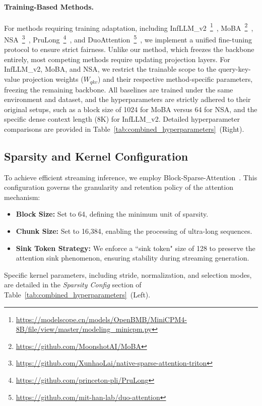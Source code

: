 \paragraph{Training-Based Methods.}
For methods requiring training adaptation, including InfLLM\_v2~\footnote{\url{https://modelscope.cn/models/OpenBMB/MiniCPM4-8B/file/view/master/modeling_minicpm.py}}~\citep{infllmv2}, MoBA~\footnote{\url{https://github.com/MoonshotAI/MoBA}}~\citep{moba}, NSA~\footnote{\url{https://github.com/XunhaoLai/native-sparse-attention-triton}}~\citep{NSA}, PruLong~\footnote{\url{https://github.com/princeton-pli/PruLong}}~\citep{bhaskar2025cache}, and DuoAttention~\footnote{\url{https://github.com/mit-han-lab/duo-attention}}~\citep{xiaoduoattention2025}, we implement a unified fine-tuning protocol to ensure strict fairness.
Unlike our method, which freezes the backbone entirely, most competing methods require updating projection layers. For InfLLM\_v2, MoBA, and NSA, we restrict the trainable scope to the query-key-value projection weights ($W_{qkv}$) and their respective method-specific parameters, freezing the remaining backbone.
All baselines are trained under the same environment and dataset, and the hyperparameters are strictly adhered to their original setups, such as a block size of 1024 for MoBA versus 64 for NSA, and the specific dense context length (8K) for InfLLM\_v2.
Detailed hyperparameter comparisons are provided in Table~\ref{tab:combined_hyperparameters}~(Right).

\subsection{Sparsity and Kernel Configuration}
\label{app:sparsity_config}

To achieve efficient streaming inference, we employ Block-Sparse-Attention~\citep{guo2024blocksparse}.
This configuration governs the granularity and retention policy of the attention mechanism:
\begin{itemize}
    \item \textbf{Block Size:} Set to 64, defining the minimum unit of sparsity.
    \item \textbf{Chunk Size:} Set to 16,384, enabling the processing of ultra-long sequences.
    \item \textbf{Sink Token Strategy:} We enforce a ``sink token" size of 128 to preserve the attention sink phenomenon, ensuring stability during streaming generation.
\end{itemize}
Specific kernel parameters, including stride, normalization, and selection modes, are detailed in the \textit{Sparsity Config} section of Table~\ref{tab:combined_hyperparameters}~(Left).


